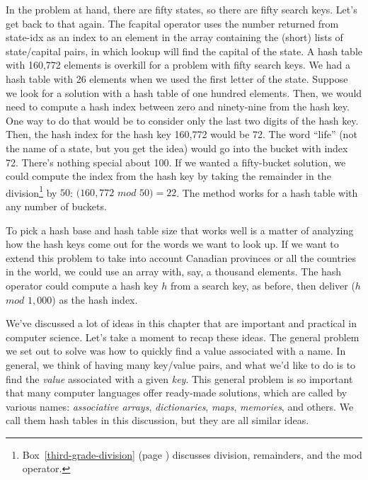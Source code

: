 In the problem at hand, there are fifty states,
so there are fifty search keys.
Let's get back to that again.
The \textsf{fcapital} operator uses the
number returned from \textsf{state-idx} as an index to
an element in the array containing the (short) lists of
state/capital pairs, in which
\textsf{lookup} will find the capital of the state.
A hash table with 160,772 elements is overkill for
a problem with fifty search keys.
We had a hash table with 26 elements when we used the first letter of the state.
Suppose we look for a solution with a hash table of one hundred elements.
Then, we would need to compute a hash index between zero and ninety-nine
from the hash key. One way to do that would be to
consider only the last two digits of the hash key.
Then, the hash index for the hash key 160,772 would be 72.
The word ``life'' (not the name of a state, but you get the idea)
would go into the bucket
with index 72.
There's nothing special about 100.
If we wanted a fifty-bucket solution,
we could compute the index from the hash key by taking the
remainder in the division\footnote{Box~\ref{third-grade-division}
(page \pageref{third-grade-division}) discusses
division, remainders, and the \textsf{mod} operator.}
by  $50$: $(160{,}772$ $mod$ $50) =  22$.
The method works for a hash table with any number of buckets.

To pick a hash base and hash table size
that works well is a matter of analyzing how
the hash keys come out for the words we want to look up.
If we want to extend this problem to take into
account Canadian provinces or all the countries in the world, we could
use an array with, say, a thousand elements.
The hash operator could compute a hash key $h$ from a search key,
as before, then deliver ($h$ $mod$ $1{,}000$) as the hash index.

We've discussed a lot of ideas in this chapter
that are important and practical in computer science.
Let's take a moment to recap these ideas.
The general problem we set out to solve was how to quickly find a value
associated with a name. In general, we think of having many key/value pairs,
and what we'd like to do is to find the \emph{value} associated with a given
\emph{key}. This general problem is so important that many computer languages
offer ready-made solutions, which are called by
various names: \emph{associative arrays}, \emph{dictionaries},
\emph{maps}, \emph{memories}, and others.
We call them hash tables in this discussion,
but they are all similar ideas.

